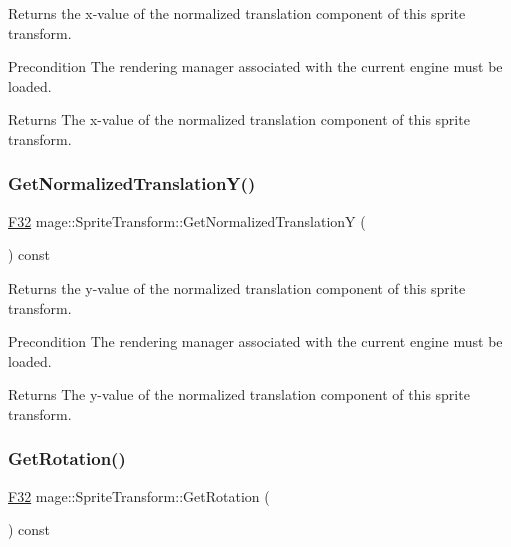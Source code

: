 Returns the x-\/value of the normalized translation component of this sprite transform.

\begin{DoxyPrecond}{Precondition}
The rendering manager associated with the current engine must be loaded. 
\end{DoxyPrecond}
\begin{DoxyReturn}{Returns}
The x-\/value of the normalized translation component of this sprite transform. 
\end{DoxyReturn}
\hypertarget{classmage_1_1_sprite_transform_a6c5685c5d45391c6d5d820677b58c976}{}\label{classmage_1_1_sprite_transform_a6c5685c5d45391c6d5d820677b58c976} 
\subsubsection{\texorpdfstring{Get\+Normalized\+Translation\+Y()}{GetNormalizedTranslationY()}}
{\footnotesize\ttfamily \hyperlink{namespacemage_aa97e833b45f06d60a0a9c4fc22ae02c0}{F32} mage\+::\+Sprite\+Transform\+::\+Get\+Normalized\+TranslationY (\begin{DoxyParamCaption}{ }\end{DoxyParamCaption}) const}

Returns the y-\/value of the normalized translation component of this sprite transform.

\begin{DoxyPrecond}{Precondition}
The rendering manager associated with the current engine must be loaded. 
\end{DoxyPrecond}
\begin{DoxyReturn}{Returns}
The y-\/value of the normalized translation component of this sprite transform. 
\end{DoxyReturn}
\hypertarget{classmage_1_1_sprite_transform_ae7fc2e36ce99ea41a74d53032437dd58}{}\label{classmage_1_1_sprite_transform_ae7fc2e36ce99ea41a74d53032437dd58} 
\subsubsection{\texorpdfstring{Get\+Rotation()}{GetRotation()}}
{\footnotesize\ttfamily \hyperlink{namespacemage_aa97e833b45f06d60a0a9c4fc22ae02c0}{F32} mage\+::\+Sprite\+Transform\+::\+Get\+Rotation (\begin{DoxyParamCaption}{ }\end{DoxyParamCaption}) const\hspace{0.3cm}{\ttfamily [noexcept]}}

